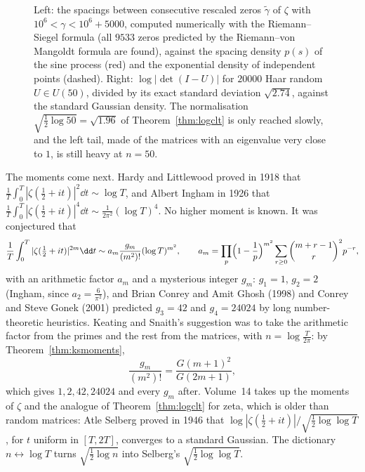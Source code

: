\begin{figure}[ht]
\centering
{}
\caption{Left: the spacings between consecutive rescaled zeros $\tilde\gamma$ of $\zeta$ with $10^6<\gamma<10^6+5000$, computed numerically with the Riemann--Siegel formula (all $9533$ zeros predicted by the
Riemann--von Mangoldt formula are found), against the spacing density $p(s)$ of the sine process (red) and the exponential density of independent points (dashed). Right: $\log|\det(I-U)|$ for $20000$ Haar random $U\in U(50)$, divided
by its exact standard deviation $\sqrt{2.74}$, against the standard Gaussian density. The normalisation $\sqrt{\frac12\log50}=\sqrt{1.96}$ of Theorem~\ref{thm:logclt} is only reached slowly, and the left tail, made of the matrices
with an eigenvalue very close to $1$, is still heavy at $n=50$.}
\label{fig:zeta}
\end{figure}

The moments come next. Hardy and Littlewood proved in 1918 that $\frac1T\int_0^T|\zeta(\frac12+it)|^2\dd t\sim\log T$, and Albert Ingham in 1926 that $\frac1T\int_0^T|\zeta(\frac12+it)|^4\dd t\sim\frac1{2\pi^2}(\log T)^4$. No higher moment is known. It was
conjectured that
\[
\frac1T\int_0^T|\zeta(\tfrac12+it)|^{2m}\dd t\sim a_m\frac{g_m}{(m^2)!}(\log T)^{m^2},\qquad a_m=\prod_p\Bigl(1-\frac1p\Bigr)^{m^2}\sum_{r\ge0}\binom{m+r-1}r^2p^{-r},
\]
with an arithmetic factor $a_m$ and a mysterious integer $g_m$: $g_1=1$, $g_2=2$ (Ingham, since $a_2=\frac6{\pi^2}$), and Brian Conrey and Amit Ghosh (1998) and Conrey and Steve Gonek (2001) predicted $g_3=42$ and
$g_4=24024$ by long number-theoretic heuristics. Keating and Snaith's suggestion was to take the arithmetic factor from the primes and the rest from the matrices, with $n=\log\frac T{2\pi}$: by Theorem~\ref{thm:ksmoments},
\[
\frac{g_m}{(m^2)!}=\frac{G(m+1)^2}{G(2m+1)},
\]
which gives $1,2,42,24024$ and every $g_m$ after. Volume~14 takes up the moments of $\zeta$ and the analogue of Theorem~\ref{thm:logclt} for zeta, which is older than random matrices: Atle Selberg proved in 1946 that
$\log|\zeta(\frac12+it)|/\sqrt{\frac12\log\log T}$, for $t$ uniform in $[T,2T]$, converges to a standard Gaussian. The dictionary $n\leftrightarrow\log T$ turns $\sqrt{\frac12\log n}$ into Selberg's $\sqrt{\frac12\log\log T}$.

